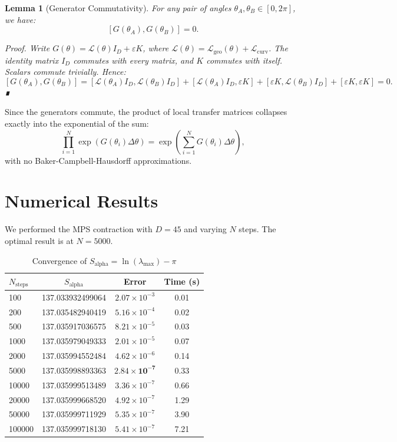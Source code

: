 \documentclass[12pt]{article}
\newtheorem{lemma}{Lemma}
\begin{document}
\begin{lemma}[Generator Commutativity]
For any pair of angles $\theta_A, \theta_B \in [0, 2\pi]$, we have:
\[
[G(\theta_A), G(\theta_B)] = 0.
\]

\textit{Proof.} Write $G(\theta) = \mathcal{L}(\theta) I_D + \varepsilon K$,
where $\mathcal{L}(\theta) = \mathcal{L}_{\text{geo}}(\theta) +
\mathcal{L}_{\text{curv}}$. The identity matrix $I_D$ commutes with every
matrix, and $K$ commutes with itself. Scalars commute trivially. Hence:
\[
[G(\theta_A), G(\theta_B)] = [\mathcal{L}(\theta_A) I_D, \mathcal{L}(\theta_B) I_D]
+ [\mathcal{L}(\theta_A) I_D, \varepsilon K]
+ [\varepsilon K, \mathcal{L}(\theta_B) I_D] + [\varepsilon K, \varepsilon K] = 0.
\]
∎
\end{lemma}

Since the generators commute, the product of local transfer matrices
collapses exactly into the exponential of the sum:
\[
\prod_{i=1}^{N} \exp(G(\theta_i) \Delta\theta) = \exp\left( \sum_{i=1}^{N}
G(\theta_i) \Delta\theta \right),
\]
with no Baker-Campbell-Hausdorff approximations.

\section{Numerical Results}

We performed the MPS contraction with $D = 45$ and varying $N$ steps.
The optimal result is at $N = 5000$.

\begin{table}[h]
\centering
\caption{Convergence of $S_{\text{alpha}} = \ln(\lambda_{\text{max}}) - \pi$}
\label{tab:convergence}
\begin{tabular}{lccc}
\toprule
$N_{\text{steps}}$ & $S_{\text{alpha}}$ & Error & Time (s) \\
\midrule
100     & 137.033932499064 & $2.07\times10^{-3}$ & 0.01 \\
200     & 137.035482940419 & $5.16\times10^{-4}$ & 0.02 \\
500     & 137.035917036575 & $8.21\times10^{-5}$ & 0.03 \\
1000    & 137.035979049333 & $2.01\times10^{-5}$ & 0.07 \\
2000    & 137.035994552484 & $4.62\times10^{-6}$ & 0.14 \\
5000    & 137.035998893363 & $\mathbf{2.84\times10^{-7}}$ & 0.33 \\
10000   & 137.035999513489 & $3.36\times10^{-7}$ & 0.66 \\
20000   & 137.035999668520 & $4.92\times10^{-7}$ & 1.29 \\
50000   & 137.035999711929 & $5.35\times10^{-7}$ & 3.90 \\
100000  & 137.035999718130 & $5.41\times10^{-7}$ & 7.21 \\
\bottomrule
\end{tabular}
\end{table}
\end{document}
